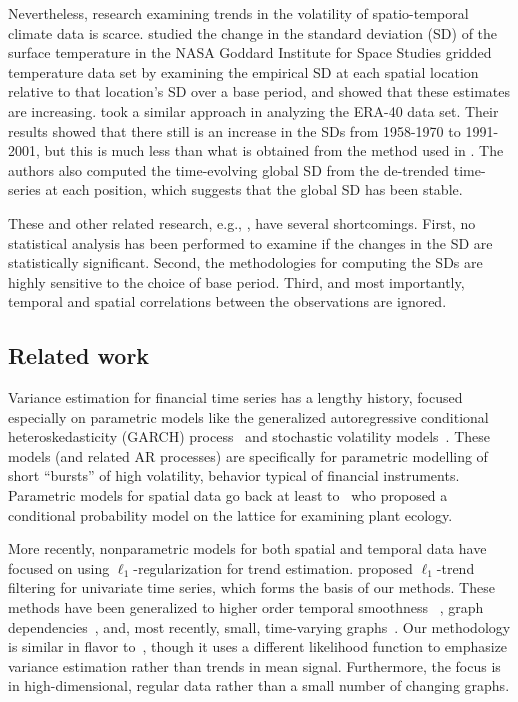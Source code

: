 \documentclass{article}
\begin{document}
Nevertheless, research examining trends in the volatility of
spatio-temporal climate data is scarce. \citep{hansen_perception_2012} studied the change in
the standard deviation (SD) of the surface temperature in the NASA
Goddard Institute for Space Studies gridded temperature data set by
examining the empirical SD at each spatial location relative to that
location's SD over a base period, and showed
that these estimates are increasing.
\citep{huntingford_no_2013} took a similar
approach in analyzing the ERA-40 data set. Their results showed that there
still is an increase in the SDs from 1958-1970 to 1991-2001, but this
is much less than what is obtained from the method used in
\citep{hansen_perception_2012}. The authors also computed the
time-evolving global SD from the de-trended time-series at each
position, which suggests that the global SD has been
stable. 

These and other related research, e.g.,
\citep{rhines_frequent_2013}, have several shortcomings. First, no
statistical analysis has been performed to examine if the changes in
the SD are statistically significant. Second, the methodologies for
computing the SDs are highly sensitive to the choice of base period. Third,
and most importantly, temporal and spatial correlations between the
observations are ignored.  


\subsection{Related work}

Variance estimation for financial time series has a lengthy history,
focused especially on parametric models like the generalized
autoregressive conditional heteroskedasticity (GARCH) process~\citep{engle2002dynamic} and
stochastic volatility models~\citep{HarveyRuiz1994}. These models (and
related AR processes) are specifically for parametric modelling of
short ``bursts'' of high volatility, behavior typical of financial
instruments. Parametric models for spatial data go back at least
to~\citep{besag1974spatial} who proposed a conditional probability
model on the lattice for examining plant ecology.

More recently, nonparametric models for both spatial and temporal data
have focused on using $\ell_1$-regularization for trend
estimation. \citep{KimKoh2009} proposed $\ell_1$-trend filtering for
univariate time series, which forms the basis of our methods. These
methods have been generalized to higher order temporal smoothness
~\citep{Tibshirani2014}, graph dependencies~\citep{WangSharpnack2016},
and, most recently, small, time-varying
graphs~\citep{HallacPark2017}. Our methodology is similar in flavor
to~\citep{HallacPark2017}, though it uses a different likelihood
function to emphasize variance estimation rather than trends in mean
signal. Furthermore, the focus is in high-dimensional, regular data
rather than a small number of changing graphs.
\end{document}
